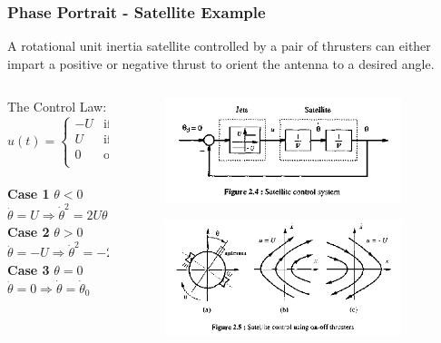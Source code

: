 \documentclass[11pt,handout]{beamer}   %
\begin{document}
\begin{frame}
\frametitle{Phase Portrait - Satellite Example}
A rotational unit inertia satellite controlled by a pair of thrusters can either impart a positive or negative thrust to orient the antenna to a desired angle.
\begin{columns}
\begin{column}{0.5\textwidth}
The Control Law:
\begin{equation*}
u(t) =   \left\{
\begin{array}{ll}
      -U &\text{if} \;\; \theta > 0 \\
      U &\text{if} \;\; \theta < 0 \\
      0 & \text{otherwise} \\
\end{array} 
\right.
\end{equation*}\\
\textbf{Case 1} $\theta < 0$ \\
$\ddot{\theta} = U \Rightarrow \dot{\theta}^2 = 2U\theta + \dot{\theta}_0$\\
\textbf{Case 2} $\theta > 0$ \\
$\ddot{\theta} = -U \Rightarrow \dot{\theta}^2 = -2U\theta + \dot{\theta}_0$\\
\textbf{Case 3} $\theta = 0$ \\
$\ddot{\theta} = 0 \Rightarrow \dot{\theta} = \dot{\theta}_0$\\
\end{column}
\begin{column}{0.5\textwidth}
\begin{figure}
\centering
\includegraphics[width=0.9\textwidth]{Figures/Satellite_Control_Block_Diagram.PNG}
\end{figure}
\begin{figure}
\centering
\includegraphics[width=0.9\textwidth]{Figures/Satellite_Phase_1.PNG}
\end{figure}
\end{column}
\end{columns}
\end{frame}
\end{document}

